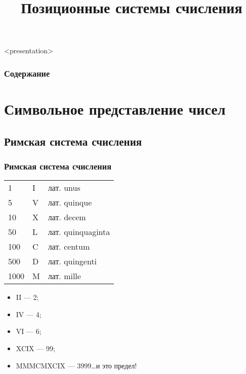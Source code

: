 


\title[Системы счисления]{Позиционные системы счисления}





\begin{frame}<presentation>
    \frametitle{Содержание}
    \tableofcontents
\end{frame}


\section{Символьное представление чисел}


\subsection{Римская система счисления}

\begin{frame}
    \frametitle{Римская система счисления}
    
    \begin{block}{}
        \begin{center}
            \begin{tabular}{lll}
                \hline\hline
                    1       &I   &лат. unus\\
                    5       &V   &лат. quinque\\
                    10      &X   &лат. decem\\
                    50      &L   &лат. quinquaginta\\
                    100     &C   &лат. centum\\
                    500     &D   &лат. quingenti\\
                    1000    &M   &лат. mille\\
                \hline\hline
            \end{tabular}
        \end{center}
    \end{block}
    \begin{itemize}
        \item II --- 2;
        \item IV --- 4;
        \item VI --- 6;
        \item XCIX --- 99;
        \item MMMCMXCIX --- 3999\ldots и это \alert{предел}!
    \end{itemize}
\end{frame}


